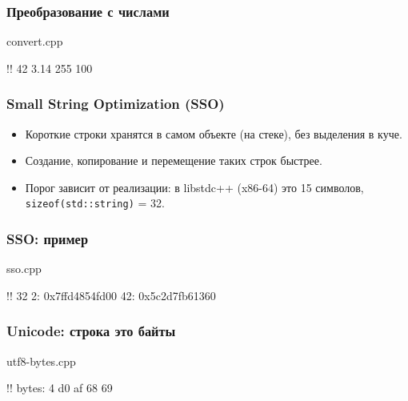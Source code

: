 \documentclass[compress, 8pt, aspectratio=169]{beamer}
\begin{document}
  \begin{frame}[fragile]

    \frametitle{Преобразование с числами}

        {convert.cpp}

    \begin{terminalwindow}
!!
42
3.14
255
100
    \end{terminalwindow}

  \end{frame}

  \begin{frame}

    \frametitle{Small String Optimization (SSO)}

    \begin{itemize}

      \item Короткие строки хранятся в самом объекте (на стеке),
        без выделения в куче.

      \item Создание, копирование и перемещение таких строк быстрее.

      \item Порог зависит от реализации: в libstdc++ (x86-64)
        это 15 символов, \texttt{sizeof(std::string)} = 32.

    \end{itemize}

  \end{frame}

  \begin{frame}[fragile]

    \frametitle{SSO: пример}

        {sso.cpp}

    \begin{terminalwindow}
!!
32
2: 0x7ffd4854fd00
42: 0x5c2d7fb61360
    \end{terminalwindow}

  \end{frame}

  \begin{frame}[fragile]

    \frametitle{Unicode: строка \textemdash \space это байты}

        {utf8-bytes.cpp}

    \begin{terminalwindow}
!!
bytes: 4
d0 af 68 69
    \end{terminalwindow}

  \end{frame}
\end{document}
